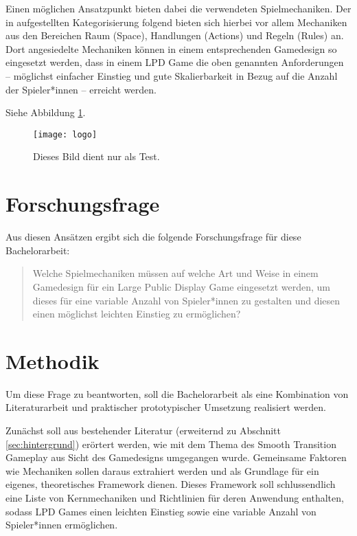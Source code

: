 Einen möglichen Ansatzpunkt bieten dabei die verwendeten Spielmechaniken. Der in \cite{Schell2019} aufgestellten Kategorisierung folgend bieten sich hierbei vor allem Mechaniken aus den Bereichen Raum (Space), Handlungen (Actions) und Regeln (Rules) an. Dort angesiedelte Mechaniken können in einem entsprechenden Gamedesign so eingesetzt werden, dass in einem LPD Game die oben genannten Anforderungen -- möglichst einfacher Einstieg und gute Skalierbarkeit in Bezug auf die Anzahl der Spieler*innen -- erreicht werden.

Siehe Abbildung \ref{fig:logo}. %

\begin{figure}
	\centering
	\texttt{[image: logo]}
	\caption{Dieses Bild dient nur als Test.}
	\label{fig:logo}
\end{figure}

\section{Forschungsfrage}

Aus diesen Ansätzen ergibt sich die folgende Forschungsfrage für diese Bachelorarbeit:
%
\begin{quote}
Welche Spielmechaniken müssen auf welche Art und Weise in einem Gamedesign für ein Large Public Display Game eingesetzt werden, um dieses für eine variable Anzahl von Spieler*innen zu gestalten und diesen einen möglichst leichten Einstieg zu ermöglichen?
\end{quote}


\section{Methodik}

Um diese Frage zu beantworten, soll die Bachelorarbeit als eine Kombination von Literaturarbeit und praktischer \bzw prototypischer Umsetzung realisiert werden.

Zunächst soll aus bestehender Literatur (erweiternd zu Abschnitt \ref{sec:hintergrund}) erörtert werden, wie mit dem Thema des Smooth Transition Gameplay aus Sicht des Gamedesigns umgegangen wurde. Gemeinsame Faktoren wie Mechaniken sollen daraus extrahiert werden und als Grundlage für ein eigenes, theoretisches Framework dienen. Dieses Framework soll schlussendlich eine Liste von Kernmechaniken und Richtlinien für deren Anwendung enthalten, sodass LPD Games einen leichten Einstieg sowie eine variable Anzahl von Spieler*innen ermöglichen.

